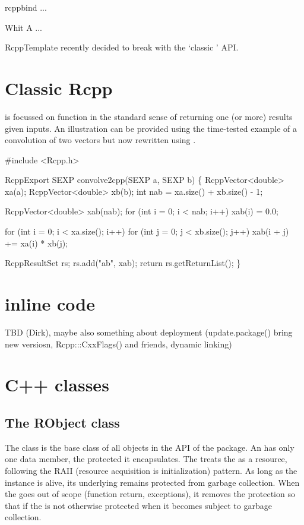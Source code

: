 rcppbind ...

Whit A ...

RcppTemplate recently decided to break with the `classic '  API.


\section{Classic Rcpp}

 is focussed on function in the standard sense of returning one (or
more) results given inputs. An illustration can be provided using the
time-tested example of a convolution of two vectors \citep{R:exts} but now
rewritten using .

\begin{example}
#include <Rcpp.h>

RcppExport SEXP convolve2cpp(SEXP a, SEXP b) \{
  RcppVector<double> xa(a);
  RcppVector<double> xb(b);
  int nab = xa.size() + xb.size() - 1;

  RcppVector<double> xab(nab);
  for (int i = 0; i < nab; i++) xab(i) = 0.0;

  for (int i = 0; i < xa.size(); i++)
    for (int j = 0; j < xb.size(); j++) 
       xab(i + j) += xa(i) * xb(j);

  RcppResultSet rs;
  rs.add("ab", xab);
  return rs.getReturnList();
\}
\end{example}

\section{inline code}

TBD (Dirk), maybe also something about deployment (update.package() bring new
versiosn, Rcpp:::CxxFlags() and friends, dynamic linking)

\section{ C++ classes}

\subsection{The RObject class}

The  class is the base class of all objects in the 
API of the  package. An  has only one 
data member, the protected  it encapsulates. 
The  treats the  as a resource, following the
RAII (resource acquisition is initialization) pattern. As long as the 
 instance is alive, its underlying  remains 
protected from garbage collection. When the  goes out 
of scope (function return, exceptions), it removes the protection so that 
if the  is not otherwise protected when it becomes subject to 
garbage collection. 

